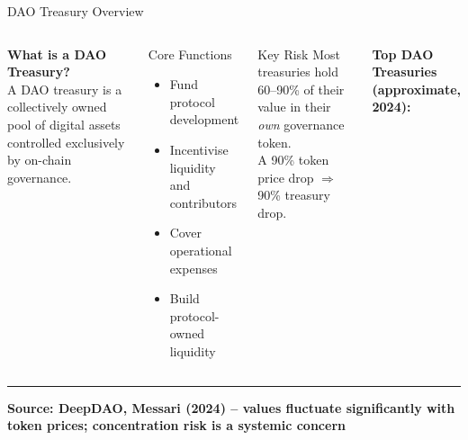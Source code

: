 \documentclass[8pt,aspectratio=169]{beamer}
\newcommand{\bottomnote}[1]{\vfill\vspace{-2mm}\textcolor{mllavender2}{\rule{\textwidth}{0.4pt}}\vspace{1mm}\footnotesize\textbf{#1}}
\begin{document}
\begin{frame}{DAO Treasury Overview}
\begin{columns}[T]
\vspace{2mm}
\textbf{\textcolor{mlpurple}{What is a DAO Treasury?}}\\[4pt]
A DAO treasury is a collectively owned pool of digital assets controlled exclusively by on-chain governance.
\vspace{6pt}

\begin{block}{Core Functions}
\begin{itemize}\setlength\itemsep{3pt}
  \item Fund protocol development
  \item Incentivise liquidity and contributors
  \item Cover operational expenses
  \item Build protocol-owned liquidity
\end{itemize}
\end{block}
\vspace{4pt}
\begin{alertblock}{Key Risk}
Most treasuries hold 60--90\% of their value in their \emph{own} governance token.\\
A 90\% token price drop $\Rightarrow$ 90\% treasury drop.
\end{alertblock}

\vspace{2mm}
\textbf{\textcolor{mlpurple}{Top DAO Treasuries (approximate, 2024):}}\\[4pt]
\end{columns}
\bottomnote{Source: DeepDAO, Messari (2024) -- values fluctuate significantly with token prices; concentration risk is a systemic concern}
\end{frame}
\end{document}
